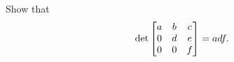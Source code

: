 \begin{exercise}
  \label{ex:hw05:three-by-three-triangular-determinant}
  Show that
  \[
    \det\begin{bmatrix}a&b&c\\0&d&e\\0&0&f\end{bmatrix}=adf.
    \handoutonly{\tag{1}}
  \]
\end{exercise}
